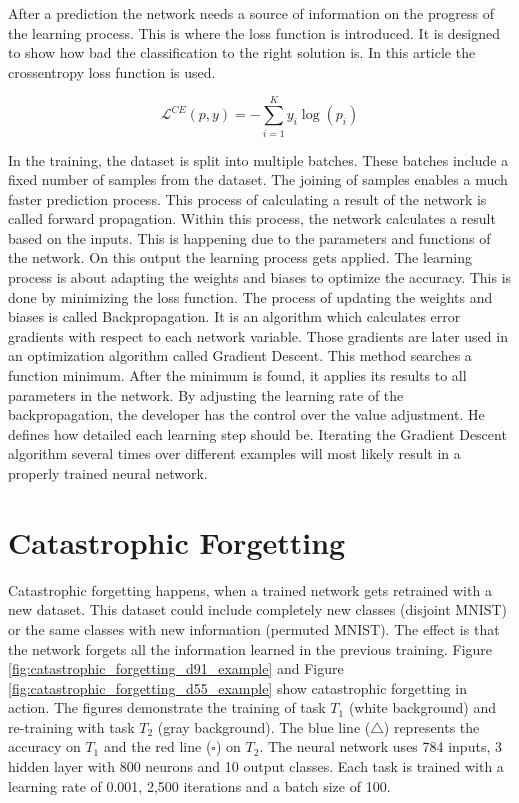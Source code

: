 After a prediction the network needs a source of information on the progress of the learning process.
This is where the loss function is introduced.
It is designed to show how bad the classification to the right solution is.
In this article the crossentropy loss function is used.
\cite{math_nn_skalski, medium_nn_from_scratch}

\begin{equation}
    \mathcal{L}^{CE}(p,y) = -\sum_{i=1}^K y_i \log(p_i)
\end{equation}

In the training, the dataset is split into multiple batches.
These batches include a fixed number of samples from the dataset.
The joining of samples enables a much faster prediction process.
This process of calculating a result of the network is called forward propagation.
Within this process, the network calculates a result based on the inputs.
This is happening due to the parameters and functions of the network.
On this output the learning process gets applied.
\cite{math_nn_skalski, medium_nn_from_scratch}
\newline
The learning process is about adapting the weights and biases to optimize the accuracy.
This is done by minimizing the loss function.
The process of updating the weights and biases is called Backpropagation.
It is an algorithm which calculates error gradients with respect to each network variable.
Those gradients are later used in an optimization algorithm called Gradient Descent.
This method searches a function minimum.
After the minimum is found, it applies its results to all parameters in the network.
By adjusting the learning rate of the backpropagation, the developer has the control over the value adjustment.
He defines how detailed each learning step should be.
\cite{math_nn_andrey}
\newline
Iterating the Gradient Descent algorithm several times over different examples will most likely result in a properly trained neural network.

\section{Catastrophic Forgetting}
\label{catastrophic_forgetting}

Catastrophic forgetting happens, when a trained network gets retrained with a new dataset.
This dataset could include completely new classes (disjoint MNIST) or the same classes with new information (permuted MNIST).
The effect is that the network forgets all the information learned in the previous training.
\newline
Figure \ref{fig:catastrophic_forgetting_d91_example} and Figure \ref{fig:catastrophic_forgetting_d55_example} show catastrophic forgetting in action.
The figures demonstrate the training of task $T_1$ (white background) and re-training with task $T_2$ (gray background).
The blue line ($\triangle$) represents the accuracy on $T_1$ and the red line ($\square$) on $T_2$.
\newline
The neural network uses 784 inputs, 3 hidden layer with 800 neurons and 10 output classes.
Each task is trained with a learning rate of 0.001, 2,500 iterations and a batch size of 100.

